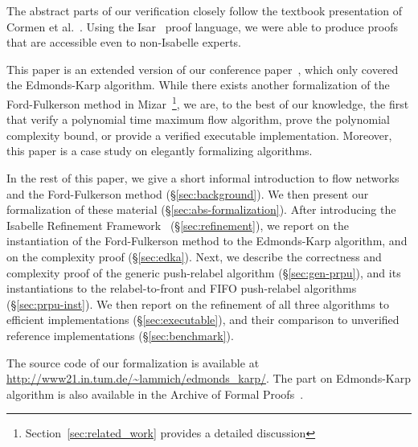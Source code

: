 \documentclass[smallcondensed]{svjour3}     %
\begin{document}
The abstract parts of our verification closely follow the textbook presentation of Cormen et al.~\cite{CLRS09}. 
Using the Isar~\cite{Wenzel99} proof language, we were able to produce proofs that are accessible even to non-Isabelle experts.

This paper is an extended version of our conference paper~\cite{LaSe16}, which only covered the Edmonds-Karp algorithm.
While there exists another formalization of the Ford-Fulkerson method in Mizar~\cite{Lee05}\footnote{Section~\ref{sec:related_work} provides a detailed discussion}, we are, to the best of our knowledge, the first that verify a polynomial time maximum flow algorithm, prove the polynomial complexity bound, or provide a verified executable implementation. Moreover, this paper is a case study on elegantly formalizing algorithms.

In the rest of this paper, we give a short informal introduction to flow networks and the Ford-Fulkerson method (\S\ref{sec:background}).
We then present our formalization of these material (\S\ref{sec:abs-formalization}). After introducing the Isabelle Refinement Framework~\cite{LaTu12,La12} (\S\ref{sec:refinement}), we report on the instantiation of the Ford-Fulkerson method to the Edmonds-Karp algorithm, and on the complexity proof (\S\ref{sec:edka}).
Next, we describe the correctness and complexity proof of the generic push-relabel algorithm (\S\ref{sec:gen-prpu}), and its instantiations 
to the relabel-to-front and FIFO push-relabel algorithms (\S\ref{sec:prpu-inst}).
We then report on the refinement of all three algorithms to efficient implementations (\S\ref{sec:executable}), and their comparison to unverified reference 
implementations (\S\ref{sec:benchmark}).

The source code of our formalization is available at \url{http://www21.in.tum.de/~lammich/edmonds_karp/}. 
The part on Edmonds-Karp algorithm is also available in the Archive of Formal Proofs~\cite{LaSe16_afp}.


\end{document}
